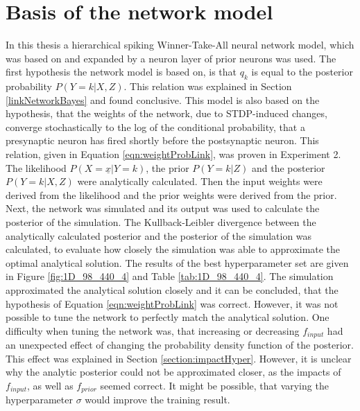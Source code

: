 \section{Basis of the network model}
\label{basisOfModel}
In this thesis a hierarchical spiking Winner-Take-All neural network model, which was based on \citet{nessler} and expanded by a neuron layer of prior neurons was used. The first hypothesis the network model is based on, is that $q_k$ is equal to the posterior probability $P(Y = k|X, Z)$. This relation was explained in Section \ref{linkNetworkBayes} and found conclusive. This model is also based on the hypothesis, that the weights of the network, due to STDP-induced changes, converge stochastically to the log of the conditional probability, that a presynaptic neuron has fired shortly before the postsynaptic neuron. This relation, given in Equation \ref{eqn:weightProbLink}, was proven in Experiment 2. The likelihood $P(X=\underline{x}|Y=k)$, the prior $P(Y=k|Z)$ and the posterior $P(Y = k|X, Z)$ were analytically calculated. Then the input weights were derived from the likelihood and the prior weights were derived from the prior. Next, the network was simulated and its output was used to calculate the posterior of the simulation. The Kullback-Leibler divergence between the analytically calculated posterior and the posterior of the simulation was calculated, to evaluate how closely the simulation was able to approximate the optimal analytical solution. The results of the best hyperparameter set are given in Figure \ref{fig:1D_98_440_4} and Table \ref{tab:1D_98_440_4}. The simulation approximated the analytical solution closely and it can be concluded, that the hypothesis of Equation \ref{eqn:weightProbLink} was correct. However, it was not possible to tune the network to perfectly match the analytical solution. One difficulty when tuning the network was, that increasing or decreasing $f_{input}$ had an unexpected effect of changing the probability density function of the posterior. This effect was explained in Section \ref{section:impactHyper}. However, it is unclear why the analytic posterior could not be approximated closer, as the impacts of $f_{input}$, as well as $f_{prior}$ seemed correct. It might be possible, that varying the hyperparameter $\sigma$ would improve the training result.

